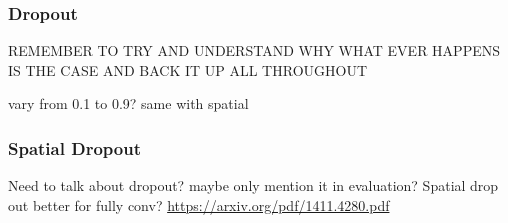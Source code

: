 \subsubsection{Dropout}



REMEMBER TO TRY AND UNDERSTAND WHY WHAT EVER HAPPENS IS THE CASE AND BACK IT UP ALL THROUGHOUT

vary from 0.1 to 0.9? same with spatial

\subsubsection{Spatial Dropout}

Need to talk about dropout? maybe only mention it in evaluation?
Spatial drop out better for fully conv? \url{https://arxiv.org/pdf/1411.4280.pdf}


